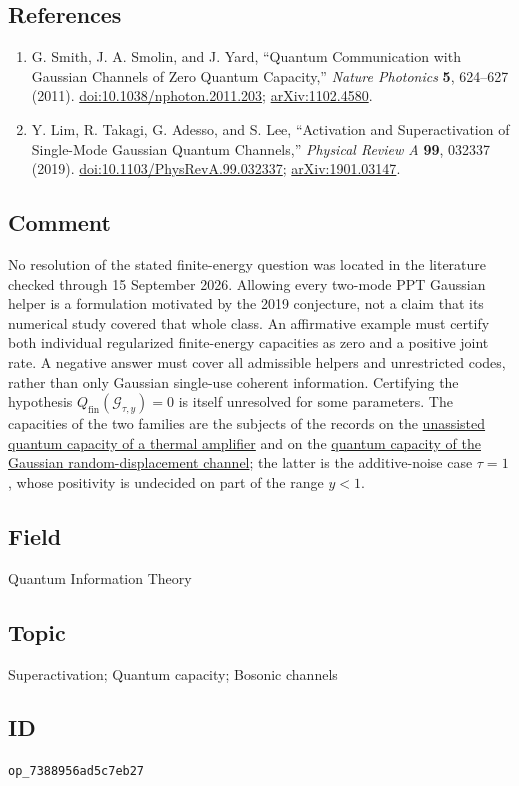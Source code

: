 \subsection*{References}

\begin{enumerate}[label={},leftmargin=4.8em,labelsep=0.5em]
  \footnotesize
  \item[\textup{[SSY11]}]\label{ref:7388-smith-smolin-yard}
  G. Smith, J. A. Smolin, and J. Yard, ``Quantum Communication with Gaussian Channels of Zero Quantum Capacity,'' \emph{Nature Photonics} \textbf{5}, 624--627 (2011). \href{https://doi.org/10.1038/nphoton.2011.203}{doi:10.1038/nphoton.2011.203}; \href{https://arxiv.org/abs/1102.4580}{arXiv:1102.4580}.

  \item[\textup{[LTA+19]}]\label{ref:7388-lim-et-al}
  Y. Lim, R. Takagi, G. Adesso, and S. Lee, ``Activation and Superactivation of Single-Mode Gaussian Quantum Channels,'' \emph{Physical Review A} \textbf{99}, 032337 (2019). \href{https://doi.org/10.1103/PhysRevA.99.032337}{doi:10.1103/PhysRevA.99.032337}; \href{https://arxiv.org/abs/1901.03147}{arXiv:1901.03147}.
\end{enumerate}

\subsection*{Comment}

No resolution of the stated finite-energy question was located in the literature checked through 15 September 2026. Allowing every two-mode PPT Gaussian helper is a formulation motivated by the 2019 conjecture, not a claim that its numerical study covered that whole class. An affirmative example must certify both individual regularized finite-energy capacities as zero and a positive joint rate. A negative answer must cover all admissible helpers and unrestricted codes, rather than only Gaussian single-use coherent information.
Certifying the hypothesis $Q_{\mathrm{fin}}(\mathcal G_{\tau,y})=0$ is itself unresolved for some parameters. The capacities of the two families are the subjects of the records on the \href{https://qiqc-op.com/problem/op_9966229e2ac69eee/}{unassisted quantum capacity of a thermal amplifier} and on the \href{https://qiqc-op.com/problem/op_1e7f431ed9013d1e/}{quantum capacity of the Gaussian random-displacement channel}; the latter is the additive-noise case $\tau=1$, whose positivity is undecided on part of the range $y<1$.

\subsection*{Field}

Quantum Information Theory

\subsection*{Topic}

Superactivation; Quantum capacity; Bosonic channels

\subsection*{ID}

\texttt{op\_7388956ad5c7eb27}
